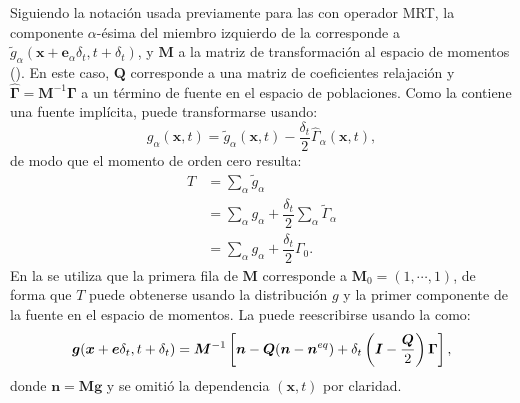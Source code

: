 Siguiendo la notaci\'on usada previamente para las \lbe{} con operador MRT, la componente $\alpha$-\'esima del miembro izquierdo de la  corresponde  a $\tilde{g}_{\alpha}(\bm{x}+\bm{e}_{\alpha}\delta_t, t+\delta_t)$, y $\bm{M}$ a la matriz de transformaci\'on al espacio de momentos ().  En este caso, $\bm{Q}$ corresponde a una matriz de coeficientes relajaci\'on y $\hat{\bm{\Gamma}} = \bm{M}^{-1}\bm{\Gamma}$ a un t\'ermino de fuente en el espacio de poblaciones. Como la  contiene una fuente impl\'icita, puede transformarse usando:
\begin{equation}
	g_{\alpha}(\bm{x},t) = \tilde{g}_{\alpha} (\bm{x},t) - \dfrac{\delta_t}{2} \hat{\Gamma}_{\alpha}(\bm{x},t),
	\label{eq:g_tilde_tranf_2d}
\end{equation}
de modo que el momento de orden cero resulta:
\begin{equation}
	\begin{aligned}
		T &= \sum_{\alpha} \tilde{g}_{\alpha} \\
		  &= \sum_{\alpha} g_{\alpha} + \dfrac{\delta_t}{2} \sum_{\alpha} \tilde{\Gamma}_{\alpha} \\
		  &= \sum_{\alpha} g_{\alpha} + \dfrac{\delta_t}{2} \Gamma_0.
	\end{aligned}
	\label{eq:T_macro_2d}
\end{equation}
En la  se utiliza que la primera fila de $\bm{M}$ corresponde a $\bm{M}_0 = (1, \cdots ,1)$, de forma que $T$ puede obtenerse usando la distribuci\'on $g$ y la primer componente de la fuente en el espacio de momentos. La  puede reescribirse usando la  como:
\begin{equation}
	\bm{g}(\bm{x} + \bm{e} \delta_t, t+\delta_t) = \bm{M}^{-1} \left[ \bm{n} - \bm{Q}(\bm{n} - \bm{n}^{eq}) + \delta_t \left( \bm{I}-\dfrac{\bm{Q}}{2}\right) \bm{\Gamma}\right],
	\label{eq:g_model_2d}
\end{equation}
donde $\bm{n} = \bm{Mg}$ y se omiti\'o la dependencia $(\bm{x},t)$ por claridad. 


